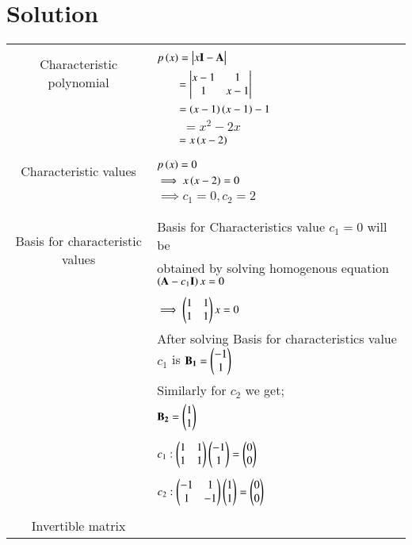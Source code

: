 \documentclass[journal,12pt]{IEEEtran}
\begin{document}
\section{\textbf{Solution}}
\renewcommand{\thetable}{2}
\begin{longtable}{|c|l|}
    \hline
	\multirow{3}{*}{Characteristic polynomial} 
	& \\
	& $p\brak{x}=\mydet{x\Vec{I}-\Vec{A}}$\\
	& $\qquad = \begin{vmatrix}x-1&1\\1&x-1\end{vmatrix}$\\
	& $\qquad=\left(x-1\right)\left(x-1\right)-1$\\
	&$\qquad=x^2-2x$\\
	&$\qquad=x\left(x-2\right)$\\
	&\\
	\hline
	\multirow{3}{*}{Characteristic values} 
	&\\
	& $p\left(x\right)=0$\\
	& $\implies x\left(x-2\right)=0$\\
	&  $\implies c_1=0,c_2=2$\\
	&\\
	\hline
	\multirow{3}{*}{Basis for characteristic values} & \\
	& Basis for Characteristics value $c_1=0$ will be\\ & obtained by solving homogenous equation $\left(\mathbf{A}-c_1\mathbf{I}\right)x=0$  \\
	&\\
	& $\implies \begin{pmatrix}1&1\\1&1\end{pmatrix}x = 0$\\
	& After solving Basis for characteristics value $c_1$ is $\mathbf{B_1} = \begin{pmatrix}-1\\1\end{pmatrix}$ \\
	& Similarly for $c_2$ we get;\\
	& $\mathbf{B_2} = \begin{pmatrix}1\\1\end{pmatrix}$\\
	&\\
	& $c_1 : \begin{pmatrix}1&1\\1&1\end{pmatrix}\begin{pmatrix}-1\\1\end{pmatrix} = \begin{pmatrix}0\\0\end{pmatrix}$\\
	&\\
	&$c_2 : \begin{pmatrix}-1&1\\1&-1\end{pmatrix}\begin{pmatrix}1\\1\end{pmatrix} = \begin{pmatrix}0\\0\end{pmatrix}$\\
	&\\
	\hline
	\multirow{3}{*}{Invertible matrix} & \\

\end{longtable}
\end{document}
